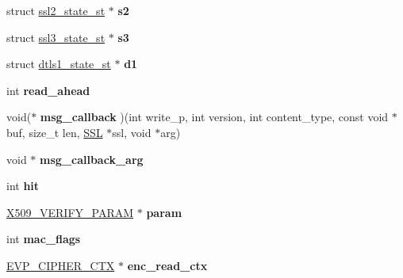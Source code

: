 \begin{DoxyCompactItemize}
\item 
\hypertarget{structssl__st_a19bb259618f022fae28970b385507815}{}struct \hyperlink{structssl2__state__st}{ssl2\+\_\+state\+\_\+st} $\ast$ {\bfseries s2}\label{structssl__st_a19bb259618f022fae28970b385507815}

\item 
\hypertarget{structssl__st_a2e2d2f47c0ac86c4329cc8035b3e4688}{}struct \hyperlink{structssl3__state__st}{ssl3\+\_\+state\+\_\+st} $\ast$ {\bfseries s3}\label{structssl__st_a2e2d2f47c0ac86c4329cc8035b3e4688}

\item 
\hypertarget{structssl__st_afd70ab79ea0917b56fa74a8cb04ddaca}{}struct \hyperlink{structdtls1__state__st}{dtls1\+\_\+state\+\_\+st} $\ast$ {\bfseries d1}\label{structssl__st_afd70ab79ea0917b56fa74a8cb04ddaca}

\item 
\hypertarget{structssl__st_a6be4ea32cec16e0cfb2034f1d8fc3f37}{}int {\bfseries read\+\_\+ahead}\label{structssl__st_a6be4ea32cec16e0cfb2034f1d8fc3f37}

\item 
\hypertarget{structssl__st_a0b5f95998bc3a4a4193adeca3b7b289a}{}void($\ast$ {\bfseries msg\+\_\+callback} )(int write\+\_\+p, int version, int content\+\_\+type, const void $\ast$buf, size\+\_\+t len, \hyperlink{structssl__st}{S\+S\+L} $\ast$ssl, void $\ast$arg)\label{structssl__st_a0b5f95998bc3a4a4193adeca3b7b289a}

\item 
\hypertarget{structssl__st_a265c0d1adbd1e76b1b326a1f82b0cfcf}{}void $\ast$ {\bfseries msg\+\_\+callback\+\_\+arg}\label{structssl__st_a265c0d1adbd1e76b1b326a1f82b0cfcf}

\item 
\hypertarget{structssl__st_a20d2f2c7a00b1fd70c28c81c2d6f34c2}{}int {\bfseries hit}\label{structssl__st_a20d2f2c7a00b1fd70c28c81c2d6f34c2}

\item 
\hypertarget{structssl__st_a384d0d3915209d3d4c8144146bab78aa}{}\hyperlink{struct_x509___v_e_r_i_f_y___p_a_r_a_m__st}{X509\+\_\+\+V\+E\+R\+I\+F\+Y\+\_\+\+P\+A\+R\+A\+M} $\ast$ {\bfseries param}\label{structssl__st_a384d0d3915209d3d4c8144146bab78aa}

\item 
\hypertarget{structssl__st_a501b23b52ff9106b5cba654187324d95}{}int {\bfseries mac\+\_\+flags}\label{structssl__st_a501b23b52ff9106b5cba654187324d95}

\item 
\hypertarget{structssl__st_ae2efb2324ed8b45b65cc2a3aa5ac1a4d}{}\hyperlink{structevp__cipher__ctx__st}{E\+V\+P\+\_\+\+C\+I\+P\+H\+E\+R\+\_\+\+C\+T\+X} $\ast$ {\bfseries enc\+\_\+read\+\_\+ctx}\label{structssl__st_ae2efb2324ed8b45b65cc2a3aa5ac1a4d}


\end{DoxyCompactItemize}
